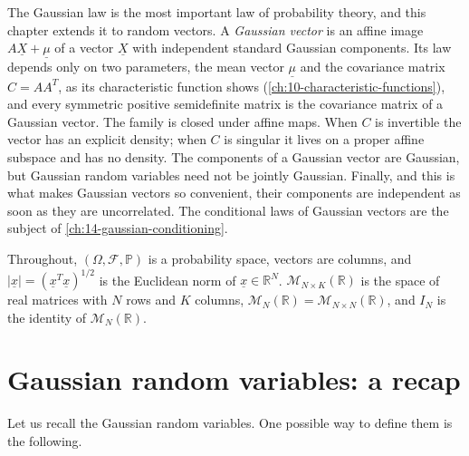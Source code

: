 
The Gaussian law is the most important law of probability theory, and this chapter extends it to
random vectors. A \emph{Gaussian vector} is an affine image $A\underline X+\underline\mu$ of a
vector $\underline X$ with independent standard Gaussian components. Its law depends only on two
parameters, the mean vector $\underline\mu$ and the covariance matrix $C=AA^T$, as its
characteristic function shows (\cref{ch:10-characteristic-functions}), and every symmetric positive
semidefinite matrix is the covariance matrix of a Gaussian vector. The family is closed under affine
maps. When $C$ is invertible the vector has an explicit density; when $C$ is singular it lives on a
proper affine subspace and has no density. The components of a Gaussian vector are Gaussian, but
Gaussian random variables need not be jointly Gaussian. Finally, and this is what makes Gaussian
vectors so convenient, their components are independent as soon as they are uncorrelated. The
conditional laws of Gaussian vectors are the subject of \cref{ch:14-gaussian-conditioning}.

Throughout, $(\Omega,\mathcal F,\mathbb P)$ is a probability space, vectors are columns, and
$|\underline x|=(\underline x^T\underline x)^{1/2}$ is the Euclidean norm of
$\underline x\in\mathbb R^N$. $\mathcal M_{N\times K}(\mathbb R)$ is the space of real matrices
with $N$ rows and $K$ columns, $\mathcal M_N(\mathbb R)=\mathcal M_{N\times N}(\mathbb R)$, and
$I_N$ is the identity of $\mathcal M_N(\mathbb R)$.

\section{Gaussian random variables: a recap}\label{sec:gv-recap}

Let us recall the Gaussian random variables. One possible way to define them is the following.

